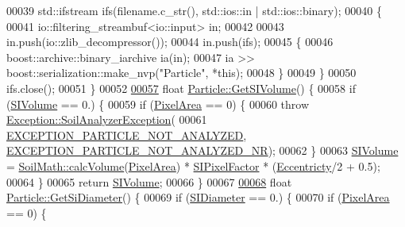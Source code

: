 \begin{DoxyCode}
00039   std::ifstream ifs(filename.c\_str(), std::ios::in | std::ios::binary);
00040   \{
00041     io::filtering\_streambuf<io::input> in;
00042 
00043     in.push(io::zlib\_decompressor());
00044     in.push(ifs);
00045     \{
00046       boost::archive::binary\_iarchive ia(in);
00047       ia >> boost::serialization::make\_nvp(\textcolor{stringliteral}{"Particle"}, *\textcolor{keyword}{this});
00048     \}
00049   \}
00050   ifs.close();
00051 \}
00052 
\hypertarget{particle_8cpp_source_l00057}{}\hyperlink{class_soil_analyzer_1_1_particle_af68a5033f943ad4bb4937a19b49a2a62}{00057} \textcolor{keywordtype}{float} \hyperlink{class_soil_analyzer_1_1_particle_af68a5033f943ad4bb4937a19b49a2a62}{Particle::GetSIVolume}() \{
00058   \textcolor{keywordflow}{if} (\hyperlink{class_soil_analyzer_1_1_particle_a62edcdac484d0822a098ac58b9927150}{SIVolume} == 0.) \{
00059     \textcolor{keywordflow}{if} (\hyperlink{class_soil_analyzer_1_1_particle_ab1489af35ea29e20ee080c24ce617c66}{PixelArea} == 0) \{
00060       \textcolor{keywordflow}{throw} \hyperlink{class_soil_analyzer_1_1_exception_1_1_soil_analyzer_exception}{Exception::SoilAnalyzerException}(
00061           \hyperlink{soilanalyzerexception_8h_ab5a65c5a9faf5f47deb0392d3ce844e8}{EXCEPTION\_PARTICLE\_NOT\_ANALYZED}, 
      \hyperlink{soilanalyzerexception_8h_a0dd1d83fbad6ddcd1f33b4ad1b8df6d7}{EXCEPTION\_PARTICLE\_NOT\_ANALYZED\_NR});
00062     \}
00063     \hyperlink{class_soil_analyzer_1_1_particle_a62edcdac484d0822a098ac58b9927150}{SIVolume} = \hyperlink{namespace_soil_math_a9a50918db8a6d4eb2c1f720942b9d63c}{SoilMath::calcVolume}(\hyperlink{class_soil_analyzer_1_1_particle_ab1489af35ea29e20ee080c24ce617c66}{PixelArea}) * 
      \hyperlink{class_soil_analyzer_1_1_particle_a5156110e9617d656a7b878a8a0fbe024}{SIPixelFactor} * (\hyperlink{class_soil_analyzer_1_1_particle_afbcac116303747794d8e00b99364d2a4}{Eccentricty}/2 + 0.5);
00064   \}
00065   \textcolor{keywordflow}{return} \hyperlink{class_soil_analyzer_1_1_particle_a62edcdac484d0822a098ac58b9927150}{SIVolume};
00066 \}
00067 
\hypertarget{particle_8cpp_source_l00068}{}\hyperlink{class_soil_analyzer_1_1_particle_aacde58abc866af8873c73044db80820b}{00068} \textcolor{keywordtype}{float} \hyperlink{class_soil_analyzer_1_1_particle_aacde58abc866af8873c73044db80820b}{Particle::GetSiDiameter}() \{
00069   \textcolor{keywordflow}{if} (\hyperlink{class_soil_analyzer_1_1_particle_a43f6f6107ddd2987f8c7a1ef25ffedaa}{SIDiameter} == 0.) \{
00070     \textcolor{keywordflow}{if} (\hyperlink{class_soil_analyzer_1_1_particle_ab1489af35ea29e20ee080c24ce617c66}{PixelArea} == 0) \{

\end{DoxyCode}
